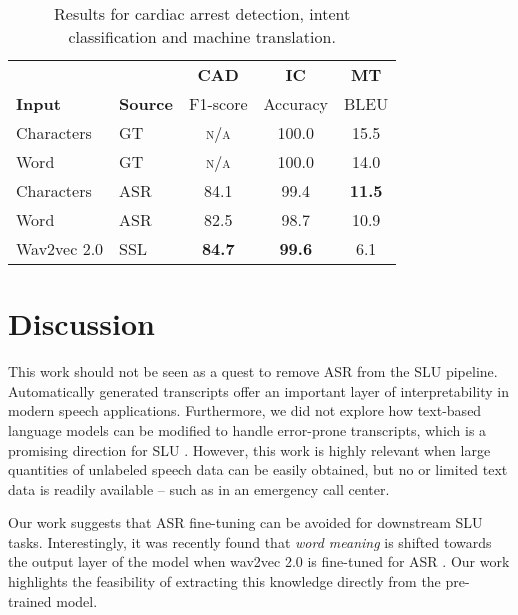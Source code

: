 \documentclass{article}
\begin{document}
\begin{table}[t]
\begin{center}
\begin{tabular}{ l  l | c c c} 
\toprule
 
 & & \textbf{CAD} & \textbf{IC} & \textbf{MT}\\
\textbf{Input} & \textbf{Source} & F1-score & Accuracy & BLEU\\

\midrule
Characters & GT & \textsc{n/a} & 100.0 & 15.5 \\
Word & GT & \textsc{n/a} & 100.0 & 14.0 \\
\midrule
Characters & ASR & 84.1 & 99.4 & \textbf{11.5} \\
Word & ASR & 82.5 & 98.7 & 10.9 \\
Wav2vec 2.0 & SSL & \textbf{84.7} & \textbf{99.6} & 6.1 \\

\bottomrule
\end{tabular}
\end{center}
\vspace{-0.4cm}
\caption{Results for cardiac arrest detection, intent classification and machine translation.} 
\label{tab:cad_ic_mt}
\end{table}

\section{Discussion}
\label{sec:discussion}



This work should not be seen as a quest to remove ASR from the SLU pipeline. Automatically generated transcripts offer an important layer of interpretability in modern speech applications. Furthermore, we did not explore how text-based language models can be modified to handle error-prone transcripts, which is a promising direction for SLU \cite{lai2021semi}. However, this work is highly relevant when large quantities of unlabeled speech data can be easily obtained, but no or limited text data is readily available -- such as in an emergency call center.

Our work suggests that ASR fine-tuning can be avoided for downstream SLU tasks. Interestingly, it was recently found that \textit{word meaning} is shifted towards the output layer of the model when wav2vec 2.0 is fine-tuned for ASR \cite{pasad2021layer}. Our work highlights the feasibility of extracting this knowledge directly from the pre-trained model.
\end{document}
